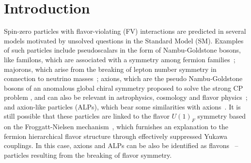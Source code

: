 \documentclass[prd,amsfonts,onecolumn,superscriptaddress,aps,nofootinbib,11pt]{revtex4-1}
\begin{document}
\maketitle
	
\section{Introduction}

\setcounter{page}{1}

Spin-zero particles with flavor-violating (FV) interactions are predicted in several models motivated by unsolved questions in the Standard Model (SM). Examples of such particles include pseudoscalars in the form of Nambu-Goldstone bosons, like  familons, which are associated with a symmetry among fermion families~\cite{Davidson:1981zd,Wilczek:1982rv,Reiss:1982sq,Gelmini:1982zz,Davidson:1983fy,Feng:1997tn}; majorons, which arise from the breaking of lepton number symmetry in connection to neutrino masses~\cite{Mohapatra:1979ia,Chikashige:1980qk,Chikashige:1980ui,Gelmini:1980re}; axions, which are the pseudo Nambu-Goldstone bosons of an anomalous global chiral symmetry proposed to solve the strong CP problem \cite{Peccei:1977hh,Weinberg:1977ma,Wilczek:1977pj,Georgi:1986df}, and can also be relevant in astrophysics, cosmology and flavor physics~\cite{DiLuzio:2020wdo,Ema:2016ops,Bjorkeroth:2018dzu}; and axion-like particles (ALPs), which bear some similarities with axions~\cite{Jaeckel:2010ni,Ringwald:2012cu,Dias:2014osa,Bauer:2021mvw,Jho:2022snj}. It is still possible that these particles are linked to the flavor $U(1)_F$ symmetry based on the Froggatt-Nielsen mechanism~\cite{Froggatt:1978nt}, which furnishes an explanation to the fermion hierarchical flavor structure through effectively suppressed Yukawa couplings. In this case, axions and ALPs can be also be identified as flavons~\cite{Ema:2016ops,Bjorkeroth:2018dzu} -- particles resulting from the breaking of flavor symmetry. 
\end{document}

